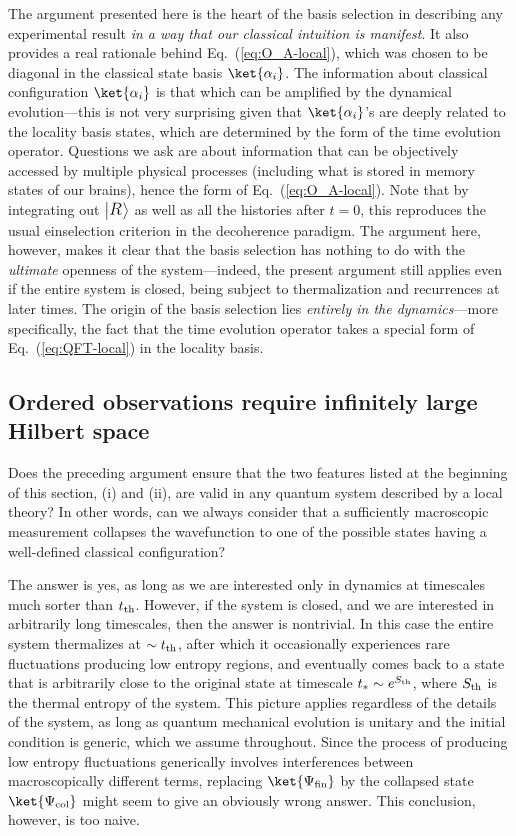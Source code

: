\documentclass[12pt]{article}
\begin{document}
The argument presented here is the heart of the basis selection in 
describing any experimental result {\it in a way that our classical 
intuition is manifest}.  It also provides a real rationale behind 
Eq.~(\ref{eq:O_A-local}), which was chosen to be diagonal in the 
classical state basis $\ket{\alpha_i}$.  The information about classical 
configuration $\ket{\alpha_i}$ is that which can be amplified by 
the dynamical evolution---this is not very surprising given that 
$\ket{\alpha_i}$'s are deeply related to the locality basis states, 
which are determined by the form of the time evolution operator. 
Questions we ask are about information that can be objectively 
accessed by multiple physical processes (including what is stored in 
memory states of our brains), hence the form of Eq.~(\ref{eq:O_A-local}). 
Note that by integrating out $\bigl|\mbox{\large $R_{}$}\bigr>$ as well 
as all the histories after $t=0$, this reproduces the usual einselection 
criterion in the decoherence paradigm.  The argument here, however, 
makes it clear that the basis selection has nothing to do with the 
{\it ultimate} openness of the system---indeed, the present argument 
still applies even if the entire system is closed, being subject to 
thermalization and recurrences at later times.  The origin of the 
basis selection lies {\it entirely in the dynamics}---more specifically, 
the fact that the time evolution operator takes a special form of 
Eq.~(\ref{eq:QFT-local}) in the locality basis.


\subsection{Ordered observations require infinitely large Hilbert space}
\label{subsec:inf-needed}

Does the preceding argument ensure that the two features listed at the 
beginning of this section, (i) and (ii), are valid in any quantum system 
described by a local theory?  In other words, can we always consider that 
a sufficiently macroscopic measurement collapses the wavefunction to one 
of the possible states having a well-defined classical configuration?

The answer is yes, as long as we are interested only in dynamics at 
timescales much sorter than $t_{\rm th}$.  However, if the system is 
closed, and we are interested in arbitrarily long timescales, then the 
answer is nontrivial.  In this case the entire system thermalizes at 
$\sim t_{\rm th}$, after which it occasionally experiences rare fluctuations 
producing low entropy regions, and eventually comes back to a state 
that is arbitrarily close to the original state at timescale $t_* \sim 
e^{S_{\rm th}}$, where $S_{\rm th}$ is the thermal entropy of the system. 
This picture applies regardless of the details of the system, as long 
as quantum mechanical evolution is unitary and the initial condition 
is generic, which we assume throughout.  Since the process of producing 
low entropy fluctuations generically involves interferences between 
macroscopically different terms, replacing $\ket{\Psi_{\rm fin}}$ by 
the collapsed state $\ket{\Psi_{\rm col}}$ might seem to give an obviously 
wrong answer.  This conclusion, however, is too naive.
\end{document}
